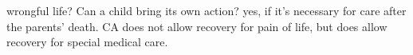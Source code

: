     \item wrongful life? Can a child bring its own action? yes, if it's necessary for care after the parents' death. CA does not allow recovery for pain of life, but does allow recovery for special medical care.
%
%
%
%
%
%
%
%
%



